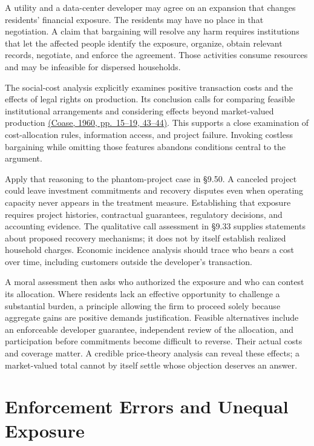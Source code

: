 \noindent \noindent A utility and a data-center developer may agree on an
expansion that changes residents' financial exposure. The residents may
have no place in that negotiation. A claim that bargaining will resolve
any harm requires institutions that let the affected people identify the
exposure, organize, obtain relevant records, negotiate, and enforce the
agreement. Those activities consume resources and may be infeasible for
dispersed households.

The social-cost analysis explicitly examines positive transaction costs
and the effects of legal rights on production. Its conclusion calls for
comparing feasible institutional arrangements and considering effects
beyond market-valued production
\href{https://doi.org/10.1086/466560}{(Coase, 1960, pp.~15--19,
43--44)}. This supports a close examination of cost-allocation rules,
information access, and project failure. Invoking costless bargaining
while omitting those features abandons conditions central to the
argument.

Apply that reasoning to the phantom-project case in §9.50. A canceled
project could leave investment commitments and recovery disputes even
when operating capacity never appears in the treatment measure.
Establishing that exposure requires project histories, contractual
guarantees, regulatory decisions, and accounting evidence. The
qualitative call assessment in §9.33 supplies statements about proposed
recovery mechanisms; it does not by itself establish realized household
charges. Economic incidence analysis should trace who bears a cost over
time, including customers outside the developer's transaction.

A moral assessment then asks who authorized the exposure and who can
contest its allocation. Where residents lack an effective opportunity to
challenge a substantial burden, a principle allowing the firm to proceed
solely because aggregate gains are positive demands justification.
Feasible alternatives include an enforceable developer guarantee,
independent review of the allocation, and participation before
commitments become difficult to reverse. Their actual costs and coverage
matter. A credible price-theory analysis can reveal these effects; a
market-valued total cannot by itself settle whose objection deserves an
answer.


\hypertarget{M09-enforcement-errors-and-unequal-exposure}{%
\section{Enforcement Errors and Unequal
Exposure}\label{M09-enforcement-errors-and-unequal-exposure}}

